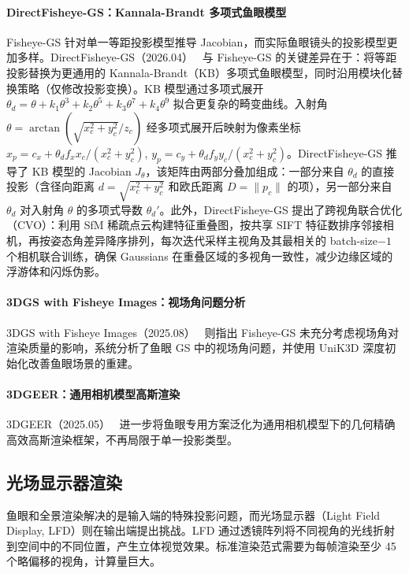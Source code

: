 \paragraph{DirectFisheye-GS：Kannala-Brandt 多项式鱼眼模型}
Fisheye-GS 针对单一等距投影模型推导 Jacobian，而实际鱼眼镜头的投影模型更加多样。DirectFisheye-GS（2026.04）~\cite{2604_00648} 与 Fisheye-GS 的关键差异在于：将等距投影替换为更通用的 Kannala-Brandt（KB）多项式鱼眼模型，同时沿用模块化替换策略（仅修改投影变换）。KB 模型通过多项式展开 $\theta_d = \theta + k_1\theta^3 + k_2\theta^5 + k_3\theta^7 + k_4\theta^9$ 拟合更复杂的畸变曲线。入射角 $\theta = \arctan(\sqrt{x_c^2+y_c^2}/z_c)$ 经多项式展开后映射为像素坐标 $x_p = c_x + \theta_d f_x x_c/(x_c^2+y_c^2)$, $y_p = c_y + \theta_d f_y y_c/(x_c^2+y_c^2)$。DirectFisheye-GS 推导了 KB 模型的 Jacobian $J_\theta$，该矩阵由两部分叠加组成：一部分来自 $\theta_d$ 的直接投影（含径向距离 $d=\sqrt{x_c^2+y_c^2}$ 和欧氏距离 $D=\|p_c\|$ 的项），另一部分来自 $\theta_d$ 对入射角 $\theta$ 的多项式导数 $\theta_d'$。此外，DirectFisheye-GS 提出了跨视角联合优化（CVO）：利用 SfM 稀疏点云构建特征重叠图，按共享 SIFT 特征数排序邻接相机，再按姿态角差异降序排列，每次迭代采样主视角及其最相关的 batch-size$-1$ 个相机联合训练，确保 Gaussians 在重叠区域的多视角一致性，减少边缘区域的浮游体和闪烁伪影。

\paragraph{3DGS with Fisheye Images：视场角问题分析}
3DGS with Fisheye Images（2025.08）~\cite{2508_06968} 则指出 Fisheye-GS 未充分考虑视场角对渲染质量的影响，系统分析了鱼眼 GS 中的视场角问题，并使用 UniK3D 深度初始化改善鱼眼场景的重建。

\paragraph{3DGEER：通用相机模型高斯渲染}
3DGEER（2025.05）~\cite{2505_24053} 进一步将鱼眼专用方案泛化为通用相机模型下的几何精确高效高斯渲染框架，不再局限于单一投影类型。

\subsection{光场显示器渲染}

鱼眼和全景渲染解决的是输入端的特殊投影问题，而光场显示器（Light Field Display, LFD）则在输出端提出挑战。LFD 通过透镜阵列将不同视角的光线折射到空间中的不同位置，产生立体视觉效果。标准渲染范式需要为每帧渲染至少 45 个略偏移的视角，计算量巨大。

